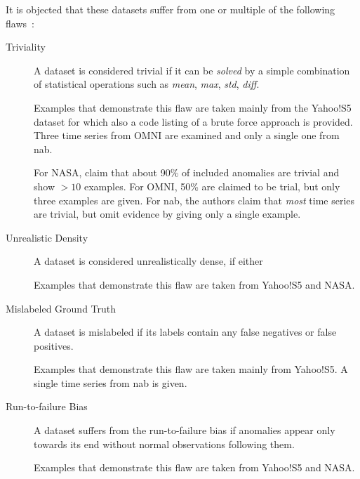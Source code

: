 It is objected that these datasets suffer from one or multiple of the following
flaws~\cite{Renjie.2020}:
\begin{description}
    \item[Triviality] A dataset is considered trivial if it can be \textit{solved}
    by a simple combination of statistical operations such as \textit{mean},
    \textit{max}, \textit{std}, \textit{diff}.
    
    Examples that demonstrate this flaw are taken mainly from the Yahoo!S5 dataset
    for which also a code listing of a brute force approach is provided. Three
    time series from OMNI are examined and only a single one from \gls{nab}.
    
    For NASA, \textcite{Renjie.2020} claim that about 90\% of included anomalies
    are trivial and show \(>10\) examples. For OMNI, 50\% are claimed to be trial,
    but only three examples are given. For \gls{nab}, the authors claim that
    \textit{most} time series are trivial, but omit evidence by giving only a
    single example.

    \item[Unrealistic Density] A dataset is considered unrealistically dense, if
    either

    Examples that demonstrate this flaw are taken from Yahoo!S5 and NASA\@.

    \item[Mislabeled Ground Truth] A dataset is mislabeled if its labels contain
    any false negatives or false positives.

    Examples that demonstrate this flaw are taken mainly from Yahoo!S5. A single
    time series from \gls{nab} is given.

    \item[Run-to-failure Bias] A dataset suffers from the run-to-failure bias if
    anomalies appear only towards its end without normal observations following
    them.

    Examples that demonstrate this flaw are taken from Yahoo!S5 and NASA\@.
\end{description}

